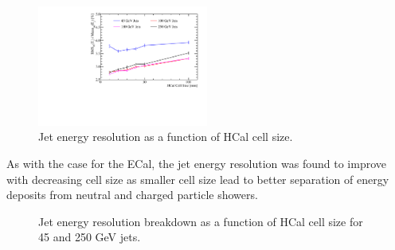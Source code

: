 \begin{figure}
\centering
\includegraphics[width=0.5\textwidth]{OptimisationStudies/Plots/JetEnergyResolutions/JER_vs_HCalCellSize.pdf}
\caption[Jet energy resolution as a function of HCal cell size.]{Jet energy resolution as a function of HCal cell size.}
\label{fig:hcalcellsize}
\end{figure}

As with the case for the ECal, the jet energy resolution was found to improve with decreasing cell size as smaller cell size lead to better separation of energy deposits from neutral and charged particle showers.

\begin{figure}
\centering
{}
\caption[Jet energy resolution breakdown as a function of HCal cell size for 45 and 250 GeV jets.]{Jet energy resolution breakdown as a function of HCal cell size for 45 and 250 GeV jets.}
\label{fig:hcalcellsizebreak}
\end{figure}

